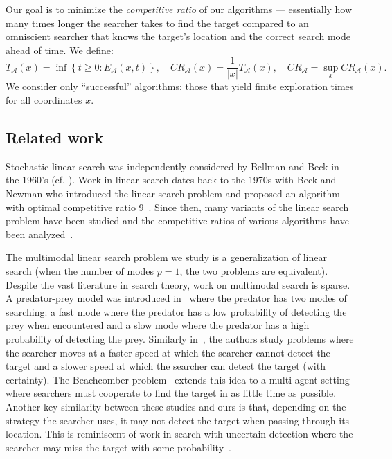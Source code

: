 Our goal is to minimize the \textit{competitive ratio} of our algorithms --- essentially how many times longer the searcher takes to find the target compared to an omniscient searcher that knows the target's location and the correct search mode ahead of time. We define:
\begin{equation*}
    T_{\mathcal{A}}(x) = \inf\left\{t\geq0 : E_{\mathcal{A}}(x,t)\right\},\quad CR_{\mathcal{A}}(x) = \frac{1}{|x|}T_{\mathcal{A}}(x),\quad CR_{\mathcal{A}} = \sup_{x} CR_{\mathcal{A}}(x) .
\end{equation*}
We consider only ``successful'' algorithms: those that yield finite exploration times for all coordinates $x$.

\subsection{Related work}

Stochastic linear search was independently considered by Bellman and Beck in the 1960's (cf. \cite{beck1964linear,bellman1963optimal}). Work in linear search dates back to the 1970s with Beck and Newman who introduced the linear search problem and proposed an algorithm with optimal competitive ratio $9$~\cite{beck1970linearsearch}.
Since then, many variants of the linear search problem have been studied and the competitive ratios of various algorithms have been analyzed~\cite{gal_search_games,baeza_yates,group_search,search_plane}. %

The multimodal linear search problem we study is a generalization of linear search (when the number of modes $p=1$, the two problems are equivalent).
Despite the vast literature in search theory, work on multimodal search is sparse.
A predator-prey model was introduced in~\cite{knoppien1985predators} where the predator has two modes of searching: a fast mode where the predator has a low probability of detecting the prey when encountered and a slow mode where the predator has a high probability of detecting the prey.
Similarly in~\cite{benichou2011intermittent}, the authors study problems where the searcher moves at a faster speed at which the searcher cannot detect the target and a slower speed at which the searcher can detect the target (with certainty).
The Beachcomber problem~\cite{beachcomber} extends this idea to a multi-agent setting where searchers must cooperate to find the target in as little time as possible.
Another key similarity between these studies and ours is that, depending on the strategy the searcher uses, it may not detect the target when passing through its location.
This is reminiscent of work in search with uncertain detection where the searcher may miss the target with some probability~\cite{gal_search_games,probabilistic_faults}.  %

